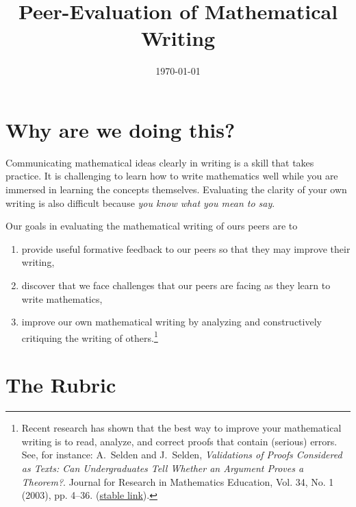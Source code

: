 \documentclass[11pt]{amsart}
\begin{document}
\title[]{Peer-Evaluation of Mathematical Writing}
\date{\today}
\maketitle
\section*{Why are we doing this?}
Communicating mathematical ideas clearly in writing is a skill that takes practice.  It is challenging to learn how to write mathematics well while you are immersed in learning the concepts themselves.  Evaluating the clarity of your own writing is also difficult because \textit{you know what you mean to say}.
 
Our goals in evaluating the mathematical writing of ours peers are to
\begin{enumerate}
	\item provide useful formative feedback to our peers so that they may improve their writing,
	\item discover that we face challenges that our peers are facing as they learn to write mathematics,
	\item improve our own mathematical writing by analyzing and constructively critiquing the writing of others.\footnote{Recent research has shown that the best way to improve your mathematical writing is to read, analyze, and correct proofs that contain (serious) errors. See, for instance: A.~Selden and J.~Selden, \textit{Validations of Proofs Considered as Texts: Can Undergraduates Tell Whether an Argument Proves a Theorem?}. Journal for Research in Mathematics Education, Vol. 34, No. 1 (2003), pp. 4--36. (\href{http://www.jstor.org/stable/30034698}{stable link}).}
\end{enumerate}

\section*{The Rubric}
\end{document}
